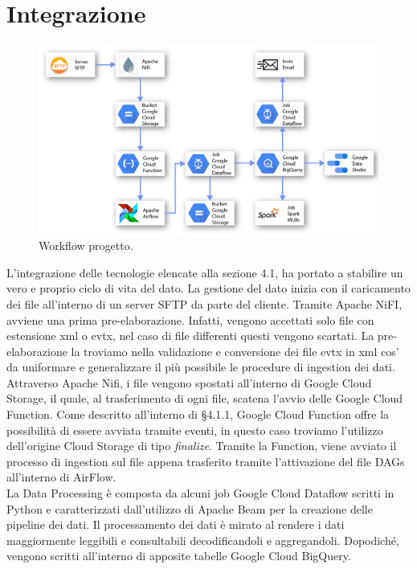 \section{Integrazione}
\begin{figure}[h!]
	\centering
	\includegraphics[scale=0.7]{figures/Schema_complessivo}
	\caption[Workflow progetto	.]{Workflow progetto.
		\label{fig:logoGCP}}
\end{figure}	
L'integrazione delle tecnologie elencate alla sezione 4.1, ha portato a stabilire un vero e proprio ciclo di vita del dato.
La gestione del dato inizia con il caricamento dei file all'interno di un \gls{server SFTP} da parte del cliente. Tramite Apache NiFI, avviene una prima pre-elaborazione. Infatti, vengono accettati solo file con estensione xml o evtx, nel caso di file differenti questi vengono scartati. La pre-elaborazione la troviamo nella validazione e conversione dei file evtx in xml cos' da uniformare e generalizzare il più possibile le procedure di ingestion dei dati.
\\
Attraverso Apache Nifi, i file vengono spostati all'interno di Google Cloud Storage, il quale, al trasferimento di ogni file, scatena l'avvio delle Google Cloud Function. Come descritto all'interno di §4.1.1, Google Cloud Function offre la possibilità di essere avviata tramite eventi, in questo caso troviamo l'utilizzo dell'origine Cloud Storage di tipo \emph{finalize}. Tramite la Function, viene avviato il processo di ingestion sul file appena trasferito tramite l'attivazione del file DAGs all'interno di AirFlow.
\\
La Data Processing è composta da alcuni job Google Cloud Dataflow scritti in \gls{Python} e caratterizzati dall'utilizzo di Apache Beam per la creazione delle pipeline dei dati.
Il processamento dei dati è mirato al rendere i dati maggiormente leggibili e consultabili decodificandoli e aggregandoli. Dopodiché, vengono scritti all'interno di apposite tabelle Google Cloud BigQuery.
